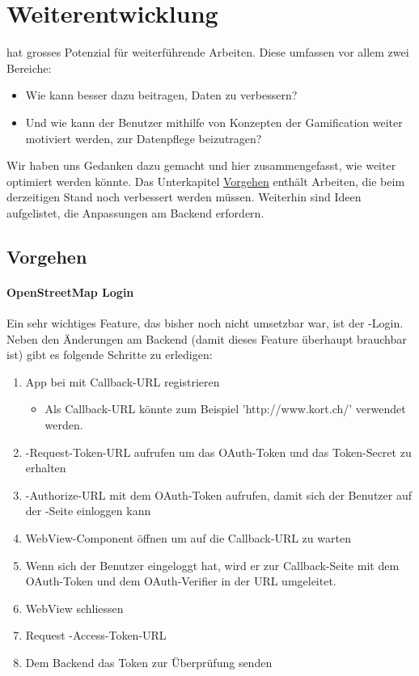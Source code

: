 \chapter{Weiterentwicklung}
\label{pd-weiterentwicklung}

\kort{} hat grosses Potenzial für weiterführende Arbeiten.
Diese umfassen vor allem zwei Bereiche:

\begin{itemize}
	\item Wie kann \kort{} besser dazu beitragen,  Daten zu verbessern?
	\item Und wie kann der Benutzer mithilfe von Konzepten der Gamification weiter motiviert werden, zur Datenpflege beizutragen?
\end{itemize}

Wir haben uns Gedanken dazu gemacht und hier zusammengefasst, wie \kort{} weiter optimiert werden könnte.
Das Unterkapitel \hyperref[pd-weiterentwicklung-vorgehen]{Vorgehen} enthält Arbeiten, die beim derzeitigen Stand noch verbessert werden müssen. 
Weiterhin sind Ideen aufgelistet, die Anpassungen am Backend erfordern.

\section{Vorgehen}
\label{pd-weiterentwicklung-vorgehen}
\subsubsection{OpenStreetMap Login}
Ein sehr wichtiges Feature, das bisher noch nicht umsetzbar war, ist der -Login.
Neben den Änderungen am Backend (damit dieses Feature überhaupt brauchbar ist) gibt es folgende Schritte zu erledigen:

\begin{enumerate}
	\item App bei  mit Callback-URL registrieren
	\begin{itemize}
		\item Als Callback-URL könnte zum Beispiel 'http://www.kort.ch/' verwendet werden.
	\end{itemize}
	\item {}-Request-Token-URL aufrufen um das OAuth-Token und das Token-Secret zu erhalten
	\item {}-Authorize-URL mit dem OAuth-Token aufrufen, damit sich der Benutzer auf der -Seite einloggen kann
	\item WebView-Component öffnen um auf die Callback-URL zu warten 
	\item Wenn sich der Benutzer eingeloggt hat, wird er zur Callback-Seite mit dem OAuth-Token und dem OAuth-Verifier in der URL umgeleitet.
	\item WebView schliessen
	\item Request -Access-Token-URL
	\item Dem Backend das Token zur Überprüfung senden
\end{enumerate}

